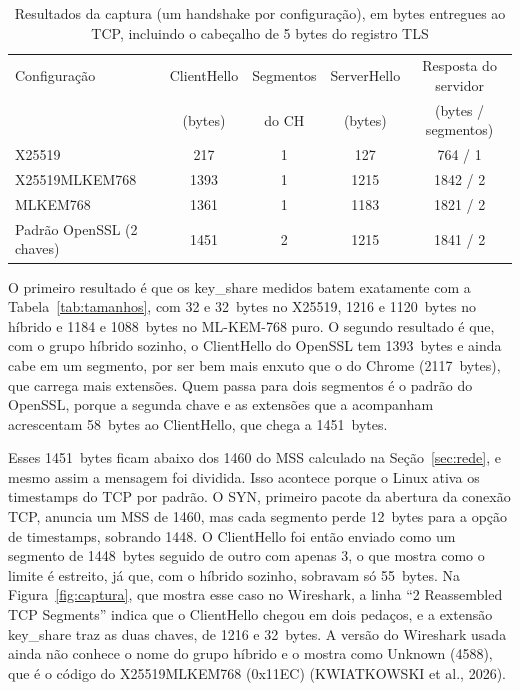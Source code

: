 \documentclass[12pt,a4paper]{article}
\newcommand{\fonte}[1]{\par\vspace{4pt}{\small Fonte: #1}}
\begin{document}
\begin{table}[H]
\centering
\caption{Resultados da captura (um handshake por configuração), em bytes entregues ao TCP, incluindo o cabeçalho de 5 bytes do registro TLS}
\label{tab:captura}
\footnotesize
\begin{tabular}{lcccc}
\toprule
Configuração & ClientHello & Segmentos & ServerHello & Resposta do servidor \\
 & (bytes) & do CH & (bytes) & (bytes / segmentos) \\
\midrule
X25519 & 217 & 1 & 127 & 764 / 1 \\
X25519MLKEM768 & 1393 & 1 & 1215 & 1842 / 2 \\
MLKEM768 & 1361 & 1 & 1183 & 1821 / 2 \\
Padrão OpenSSL (2 chaves) & 1451 & 2 & 1215 & 1841 / 2 \\
\bottomrule
\end{tabular}
\fonte{Elaborado pelos autores.}
\end{table}

O primeiro resultado é que os key\_share medidos batem exatamente
com a Tabela~\ref{tab:tamanhos}, com 32 e 32~bytes no X25519, 1216 e
1120~bytes no híbrido e 1184 e 1088~bytes no ML-KEM-768 puro. O segundo resultado é que, com o grupo híbrido sozinho, o
ClientHello do OpenSSL tem 1393~bytes e ainda cabe em um
segmento, por ser bem mais enxuto que o do Chrome (2117~bytes), que
carrega mais extensões. Quem passa para dois segmentos é o padrão do
OpenSSL, porque a segunda chave e as extensões que a acompanham acrescentam
58~bytes ao ClientHello, que chega a 1451~bytes.

Esses 1451~bytes ficam abaixo dos 1460 do MSS calculado na
Seção~\ref{sec:rede}, e mesmo assim a mensagem foi dividida. Isso acontece
porque o Linux ativa os timestamps do TCP por padrão. O SYN, primeiro
pacote da abertura da conexão TCP, anuncia um MSS de 1460, mas cada segmento perde 12~bytes para a opção de timestamps,
sobrando 1448. O ClientHello foi então enviado como um segmento
de 1448~bytes seguido de outro com apenas 3, o que mostra como o limite é estreito, já que, com o híbrido sozinho,
sobravam só 55~bytes. Na Figura~\ref{fig:captura}, que mostra esse caso no Wireshark, a linha
``2 Reassembled TCP Segments'' indica que o ClientHello chegou
em dois pedaços, e a extensão key\_share traz as duas chaves, de
1216 e 32~bytes. A versão do Wireshark usada ainda não conhece o nome do
grupo híbrido e o mostra como Unknown (4588), que é o código do
X25519MLKEM768 (0x11EC) (KWIATKOWSKI et al., 2026).
\end{document}
